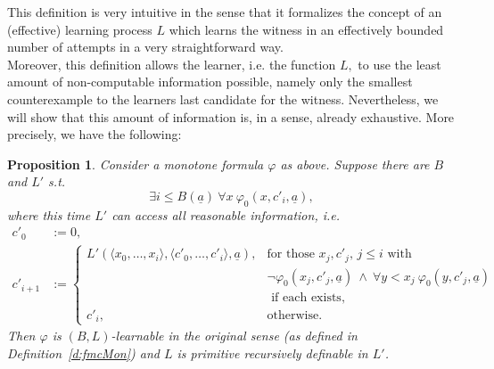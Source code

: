 \documentclass[1p]{elsarticle}
\newcommand{\tup}{\underline} %
\newcommand{\Telse}{\text{otherwise}}
\theoremstyle{plain}
\newtheorem{prop}[thm]{Proposition}
\theoremstyle{definition}
\theoremstyle{remark}
\renewcommand{\phi}{\varphi}
\theoremstyle{definition}
\begin{document}
This definition is very intuitive in the sense that it formalizes the concept of an (effective) learning process $L$ which learns the witness in an effectively bounded number of attempts in a very straightforward way.\\
Moreover, this definition allows the learner, i.e. the function $L,$ to use the least amount of non-computable information possible, namely only the smallest counterexample to the learners last candidate for the witness. 
Nevertheless, we will show that this amount of information is, in a sense, 
already exhaustive. More precisely, we have the following:
\begin{prop}\label{p:allx}
Consider a monotone formula $\phi$ as above. Suppose there are $B$ and $L'$ s.t.
\[ \exists i\leq B(\tup a)\ \forall x\ \phi_0(x,c'_i,\tup a),\] where this 
time $L'$ can access all reasonable information, i.e.
\begin{align*}
c'_0&:=0,\\
c'_{i+1}&:=
\begin{cases}
L'(\langle x_0,\ldots,x_i\rangle, \langle c'_0,\ldots,c'_i\rangle,\tup a), &\text{for those $x_j,c'_j$, $j\leq i$ with }\\
 &\neg\phi_0(x_j,c'_j,\tup a)\ \wedge\ \forall y<x_j\ \phi_0(y,c'_j,\tup a)\\
  &\text{ if each exists},\\
c'_i, &\Telse.
\end{cases}
\end{align*}
Then $\phi$ is $(B,L)$-learnable in the original sense (as defined in Definition~\ref{d:fmcMon}) and $L$ is primitive recursively definable in $L'$.
\end{prop}
\end{document}
